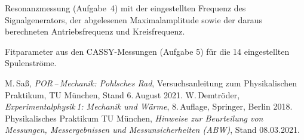 \documentclass[11pt,a4paper]{article}
\begin{document}
\begin{table}[H]
\centering
\caption{Resonanzmessung (Aufgabe~4) mit der eingestellten
Frequenz des Signalgenerators, der abgelesenen Maximalamplitude
sowie der daraus berechneten Antriebsfrequenz und Kreisfrequenz.}
\label{tab:resonanz_anh}

\end{table}

\begin{table}[H]
\centering
\caption{Fitparameter aus den CASSY-Messungen (Aufgabe 5) für die
\num{14} eingestellten Spulenströme.}
\label{tab:lambda_I_anh}

\end{table}

\begin{thebibliography}{9}
 M.\,Saß, \emph{POR\,--\,Mechanik: Pohlsches Rad},
  Versuchsanleitung zum Physikalischen Praktikum, TU München, Stand
  6.\,August 2021.
 W.\,Demtröder, \emph{Experimentalphysik\,1:
  Mechanik und Wärme}, 8.\,Auflage, Springer, Berlin 2018.
 Physikalisches Praktikum TU München, \emph{Hinweise
  zur Beurteilung von Messungen, Messergebnissen und
  Messunsicherheiten (ABW)}, Stand 08.03.2021.
\end{thebibliography}
\end{document}
